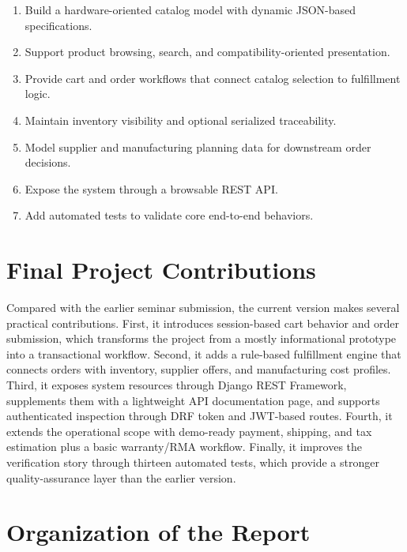 \documentclass[12pt,letterpaper,oneside,openany]{book}
\begin{document}
\begin{enumerate}[leftmargin=0.4in]
    \item Build a hardware-oriented catalog model with dynamic JSON-based specifications.
    \item Support product browsing, search, and compatibility-oriented presentation.
    \item Provide cart and order workflows that connect catalog selection to fulfillment logic.
    \item Maintain inventory visibility and optional serialized traceability.
    \item Model supplier and manufacturing planning data for downstream order decisions.
    \item Expose the system through a browsable REST API.
    \item Add automated tests to validate core end-to-end behaviors.
\end{enumerate}

\section{Final Project Contributions}

\begin{justifying}
Compared with the earlier seminar submission, the current version makes several
practical contributions. First, it introduces session-based cart behavior and
order submission, which transforms the project from a mostly informational
prototype into a transactional workflow. Second, it adds a rule-based
fulfillment engine that connects orders with inventory, supplier offers, and
manufacturing cost profiles. Third, it exposes system resources through Django
REST Framework, supplements them with a lightweight API documentation page, and
supports authenticated inspection through DRF token and JWT-based routes.
Fourth, it extends the operational scope with demo-ready payment, shipping, and
tax estimation plus a basic warranty/RMA workflow. Finally, it improves the
verification story through thirteen automated tests, which provide a stronger
quality-assurance layer than the earlier version.
\end{justifying}

\section{Organization of the Report}
\end{document}
